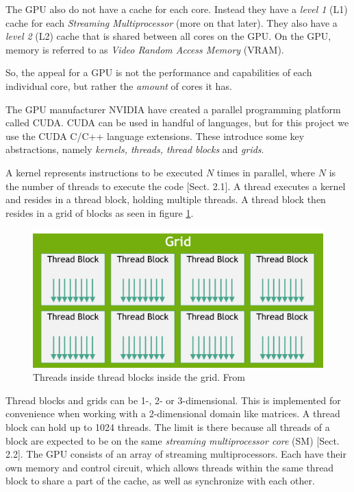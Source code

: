 The GPU also do not have a cache for each core. Instead they have a \textit{level 1} (L1) cache for each \textit{Streaming Multiprocessor} (more on that later). They also have a \textit{level 2} (L2) cache that is shared between all cores on the GPU. On the GPU, memory is referred to as \textit{Video Random Access Memory} (VRAM).

So, the appeal for a GPU is not the performance and capabilities of each individual core, but rather the \textit{amount} of cores it has.

\noindent The GPU manufacturer NVIDIA have created a parallel programming platform called CUDA. CUDA can be used in handful of languages, but for this project we use the CUDA C/C++ language extensions. These introduce some key abstractions, namely \textit{kernels, threads, thread blocks} and \textit{grids}. 

A kernel represents instructions to be executed $N$ times in parallel, where $N$ is the number of threads to execute the code [Sect. 2.1]\cite{nvidia:cudadoc}. A thread executes a kernel and resides in a thread block, holding multiple threads. A thread block then resides in a grid of blocks as seen in figure \ref{fig:threads and blocks}.

\begin{figure}[ht]
\includegraphics[width=\textwidth]{Documents/Report/Figures/Threads and blocks.png}
\caption{Threads inside thread blocks inside the grid. From \cite{nvidia:cudadoc}}
\label{fig:threads and blocks}
\end{figure}

Thread blocks and grids can be 1-, 2- or 3-dimensional. This is implemented for convenience when working with a 2-dimensional domain like matrices. A thread block can hold up to 1024 threads. The limit is there because all threads of a block are expected to be on the same \textit{streaming multiprocessor core} (SM) [Sect. 2.2]\cite{nvidia:cudadoc}. The GPU consists of an array of streaming multiprocessors. Each have their own memory and control circuit, which allows threads within the same thread block to share a part of the cache, as well as synchronize with each other. 

